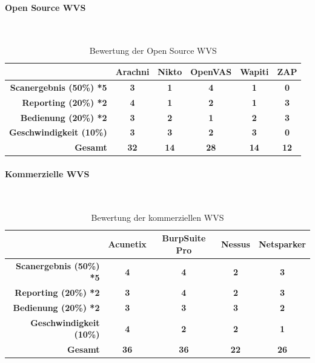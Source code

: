 \documentclass[12pt,oneside,a4paper,parskip]{scrbook}
\begin{document}
     \paragraph{Open Source WVS}
     \
       \begin{table}[H]
       \begin{tabular}{|r|c|c|c|c|c|}
       \hline
       \textbf{}            & \textbf{Arachni} & \textbf{Nikto} & \textbf{OpenVAS} & \textbf{Wapiti} & \textbf{ZAP}  \\
       \hline
       \textbf{Scanergebnis (50\%) *5}    & \textbf{3}      &  \textbf{1}      & \textbf{4}      &   \textbf{1}     &  \textbf{0}       \\
       \hline
       \textbf{Reporting (20\%) *2}       &  \textbf{4}     &  \textbf{1}      & \textbf{2}      &   \textbf{1}    &   \textbf{3}     \\
       \hline
       \textbf{Bedienung (20\%) *2}       & \textbf{3}       & \textbf{2}     & \textbf{1}       & \textbf{2}      & \textbf{3}        \\
       \hline
       \textbf{Geschwindigkeit (10\%)} & \textbf{3}       & \textbf{3}    & \textbf{2}       & \textbf{3}     & \textbf{0}          \\
       \hline
       \textbf{Gesamt}                 &   \textbf{32}     &  \textbf{14}   &  \textbf{28}      &  \textbf{14}    &  \textbf{12}          \\
       \hline
       \end{tabular}
       \caption[Bewertung der Open Source WVS]{Bewertung der Open Source WVS}
     \end{table}
     \paragraph{Kommerzielle WVS}
     \
       \begin{table}[H]
       \begin{tabular}{|r|c|c|c|c|}
       \hline
       \textbf{}       & \textbf{Acunetix} & \textbf{BurpSuite Pro} & \textbf{Nessus} & \textbf{Netsparker}  \\
       \hline
       \textbf{Scanergebnis (50\%) *5}    & \textbf{4}      &  \textbf{4}            & \textbf{2}      &   \textbf{3}         \\
       \hline
       \textbf{Reporting (20\%) *2}       &  \textbf{3}     &  \textbf{4}            & \textbf{2}      &   \textbf{3}         \\
       \hline
       \textbf{Bedienung (20\%) *2}       & \textbf{3}      & \textbf{3}           & \textbf{3}      & \textbf{2}        \\
       \hline
       \textbf{Geschwindigkeit (10\%)} & \textbf{4}       & \textbf{2}              & \textbf{2}      & \textbf{1}            \\
       \hline
       \textbf{Gesamt}                 &  \textbf{36}     & \textbf{36}              & \textbf{22}       &  \textbf{26}                    \\
       \hline
       \end{tabular}
       \caption[Bewertung der kommerziellen WVS]{Bewertung der kommerziellen WVS}
     \end{table}
\end{document}
